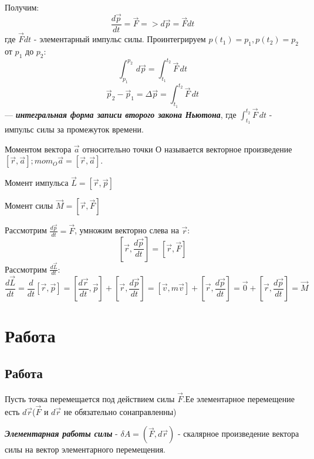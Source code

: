 \documentclass[../main.tex]{subfiles}
\begin{document}
Получим:
\[ \frac{d\vec p}{dt} = \vec F => d\vec p = \vec F dt\]
где $\vec Fdt$ - элементарный импульс силы. Проинтегрируем $p(t_1) = p_1, p(t_2) = p_2$ от $p_1$ до $p_2$:
\[ \int_{p_1}^{p_2}\,d\vec p  = \int_{t_1}^{t_2} \vec F \,dt \]
\[\vec p_2 - \vec p_1 = \Delta \vec p = \int_{t_1}^{t_2} \vec F \,dt\]
--- \textbf{\textit{интегральная форма записи второго закона Ньютона}}, где $\int_{t_1}^{t_2} \vec F \,dt$ - импульс силы за промежуток времени.

\vspace{5px}

 Моментом вектора $\vec a$ относительно точки О называется векторное произведение $[\vec r, \vec a]; mom_O \vec a = [\vec r, \vec a]$.

\vspace{5px}

 Момент импульса $\vec L = [\vec r, \vec p]$

\vspace{5px}

 Момент силы $\vec M = [\vec r, \vec F]$

\vspace{5px}

Рассмотрим $\frac{d\vec p}{dt} = \vec F$, умножим векторно слева на $\vec r$:
\[ [\vec r, \frac{d \vec p}{dt}] = [\vec r, \vec F]\]
Рассмотрим $\frac{d\vec L}{dt}$:
\[\frac{d\vec L}{dt} = \frac{d}{dt}[\vec r, \vec p] = [\frac{d\vec r}{dt}, \vec p] + [\vec r, \frac{d \vec p}{dt}] = [\vec v, m \vec v] + [\vec r, \frac{d\vec p}{dt}] = \vec 0 + [\vec r, \frac{d\vec p}{dt}] = \vec M\]

\section{Работа}
\subsection{Работа}
Пусть точка перемещается под действием силы $\vec F$.Ее элементарное перемещение есть $d\vec r$($\vec F$ и $d\vec r$ не обязательно сонаправленны)

\vspace{3px}

  \textbf{\textit{Элементарная работы силы}} - $\delta A = (\vec F, d\vec r)$ - скалярное произведение вектора силы на вектор элементарного перемещения.
\end{document}
